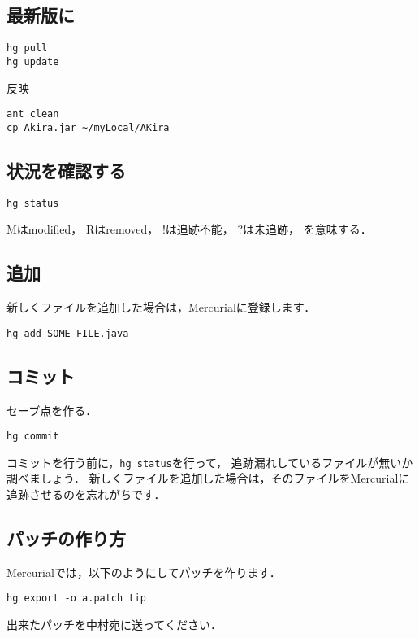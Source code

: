 \documentclass[a4j,openany]{jbook}
\begin{document}
  \subsection{最新版に}
\begin{screen}
\begin{verbatim}
hg pull
hg update
\end{verbatim}
\end{screen}

反映
\begin{screen}
\begin{verbatim}
ant clean
cp Akira.jar ~/myLocal/AKira
\end{verbatim}
\end{screen}

  \subsection{状況を確認する}
\begin{screen}
\begin{verbatim}
hg status
\end{verbatim}
\end{screen}
Mはmodified，
Rはremoved，
!は追跡不能，
?は未追跡，
を意味する．

  \subsection{追加}
新しくファイルを追加した場合は，Mercurialに登録します．
\begin{screen}
\begin{verbatim}
hg add SOME_FILE.java
\end{verbatim}
\end{screen}

  \subsection{コミット}
セーブ点を作る．
\begin{screen}
\begin{verbatim}
hg commit
\end{verbatim}
\end{screen}
コミットを行う前に，\verb|hg status|を行って，
追跡漏れしているファイルが無いか調べましょう．
新しくファイルを追加した場合は，そのファイルをMercurialに追跡させるのを忘れがちです．

  \subsection{パッチの作り方}
 Mercurialでは，以下のようにしてパッチを作ります．
 \begin{screen}
\begin{verbatim}
hg export -o a.patch tip
\end{verbatim}
 \end{screen}
 出来たパッチを中村宛に送ってください．
\end{document}

